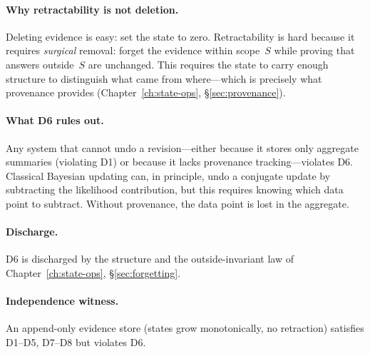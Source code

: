 \paragraph{Why retractability is not deletion.}
Deleting evidence is easy: set the state to zero.  Retractability is
hard because it requires \emph{surgical} removal: forget the evidence
within scope~$S$ while proving that answers outside~$S$ are unchanged.
This requires the state to carry enough structure to distinguish what
came from where---which is precisely what provenance provides
(Chapter~\ref{ch:state-ops}, \S\ref{sec:provenance}).

\paragraph{What D6 rules out.}
Any system that cannot undo a revision---either because it stores only
aggregate summaries (violating D1) or because it lacks provenance
tracking---violates D6.  Classical Bayesian updating can, in principle,
undo a conjugate update by subtracting the likelihood contribution,
but this requires knowing which data point to subtract.  Without
provenance, the data point is lost in the aggregate.

\paragraph{Discharge.}
D6 is discharged by the  structure and the
outside-invariant law of Chapter~\ref{ch:state-ops},
\S\ref{sec:forgetting}.

\paragraph{Independence witness.}
An append-only evidence store (states grow monotonically, no
retraction) satisfies D1--D5, D7--D8 but violates D6.



